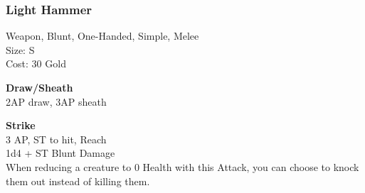 \subsubsection{Light Hammer}\label{weapon:lightHammer}
Weapon, Blunt, One-Handed, Simple, Melee\\
Size: S\\
Cost: 30 Gold

\textbf{Draw/Sheath} \\
2AP draw, 3AP sheath

\textbf{Strike} \\
3 AP, ST to hit,  Reach\\
1d4 + \texttimes ST Blunt Damage\\
When reducing a creature to 0 Health with this Attack, you can choose to knock them out instead of killing them.
